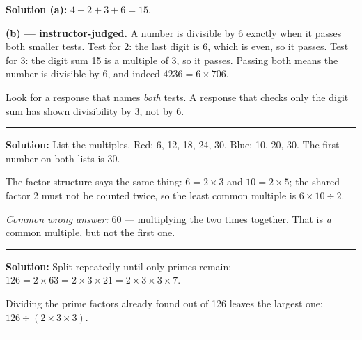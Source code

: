 \documentclass[12pt]{article}
\begin{document}
\textbf{Solution (a):} $4 + 2 + 3 + 6 = 15$. 

\textbf{(b) --- instructor-judged.} A number is divisible by 6 exactly when it passes both smaller tests. Test for 2: the last digit is 6, which is even, so it passes. Test for 3: the digit sum 15 is a multiple of 3, so it passes. Passing both means the number is divisible by 6, and indeed $4236 = 6 \times 706$.

Look for a response that names \emph{both} tests. A response that checks only the digit sum has shown divisibility by 3, not by 6.

\vspace{0.15cm}\noindent\rule{\linewidth}{0.2pt}\vspace{0.15cm}


\textbf{Solution:} List the multiples. Red: 6, 12, 18, 24, 30. Blue: 10, 20, 30. The first number on both lists is 30.

The factor structure says the same thing: $6 = 2 \times 3$ and $10 = 2 \times 5$; the shared factor 2 must not be counted twice, so the least common multiple is $6 \times 10 \div 2$. 

\emph{Common wrong answer:} 60 --- multiplying the two times together. That is \emph{a} common multiple, but not the first one.

\vspace{0.15cm}\noindent\rule{\linewidth}{0.2pt}\vspace{0.15cm}


\textbf{Solution:} Split repeatedly until only primes remain: $126 = 2 \times 63 = 2 \times 3 \times 21 = 2 \times 3 \times 3 \times 7$.

Dividing the prime factors already found out of 126 leaves the largest one: $126 \div (2 \times 3 \times 3)$. 

\vspace{0.15cm}\noindent\rule{\linewidth}{0.2pt}\vspace{0.15cm}

\end{document}
